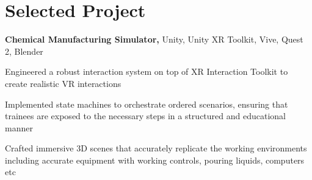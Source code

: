 \section{Selected Project}
\begin{onecolentry}
\textbf{Chemical Manufacturing Simulator,} Unity, Unity XR Toolkit, Vive, Quest 2, Blender 
\end{onecolentry}

\vspace{0.10 cm}
\begin{onecolentry}
    \begin{highlights}
        \item Engineered a robust interaction system on top of XR Interaction Toolkit to create realistic VR interactions 
        \item Implemented state machines to orchestrate ordered scenarios, ensuring that trainees are exposed to the necessary steps in a structured and educational manner
        \item  Crafted immersive 3D scenes that accurately replicate the working environments including accurate equipment with working controls, pouring liquids, computers etc
    \end{highlights}
\end{onecolentry}